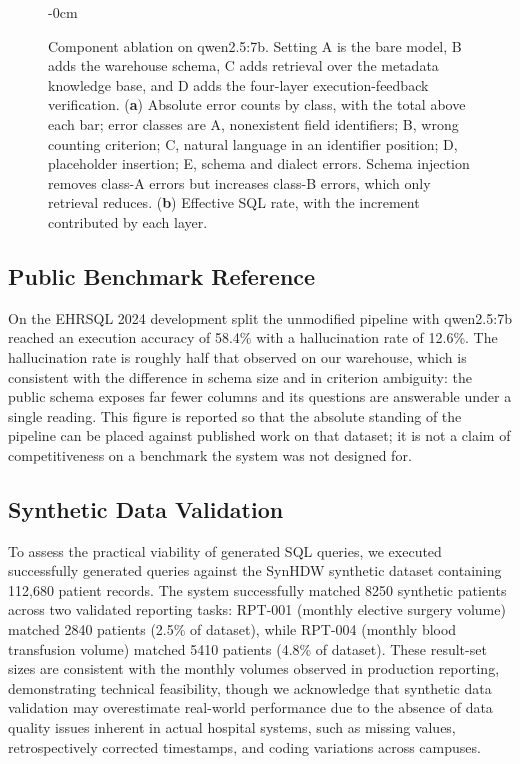 \documentclass[applsci,article,submit,pdftex,oneauthor]{Definitions/mdpi}
\begin{document}
\begin{figure}[H]
\begin{adjustwidth}{-\extralength}{0cm}
\caption{Component ablation on qwen2.5:7b. Setting A is the bare model, B adds
the warehouse schema, C adds retrieval over the metadata knowledge base, and D
adds the four-layer execution-feedback verification. (\textbf{a}) Absolute error
counts by class, with the total above each bar; error classes are A, nonexistent
field identifiers; B, wrong counting criterion; C, natural language in an
identifier position; D, placeholder insertion; E, schema and dialect errors.
Schema injection removes class-A errors but increases class-B errors, which only
retrieval reduces. (\textbf{b}) Effective SQL rate, with the increment
contributed by each layer.}
\label{fig:ablation}
\end{adjustwidth}
\end{figure}

\subsection{Public Benchmark Reference}\label{sec:bench}
On the EHRSQL 2024 development split the unmodified pipeline with qwen2.5:7b
reached an execution accuracy of 58.4\% with a hallucination rate of 12.6\%. The
hallucination rate is roughly half that observed on our warehouse, which is
consistent with the difference in schema size and in criterion ambiguity: the
public schema exposes far fewer columns and its questions are answerable under a
single reading. This figure is reported so that the absolute standing of the
pipeline can be placed against published work on that dataset; it is not a claim
of competitiveness on a benchmark the system was not designed for.

\subsection{Synthetic Data Validation}
To assess the practical viability of generated SQL queries, we executed
successfully generated queries against the SynHDW synthetic dataset containing
112,680 patient records. The system successfully matched 8250 synthetic patients
across two validated reporting tasks: RPT-001 (monthly elective surgery volume)
matched 2840 patients (2.5\% of dataset), while RPT-004 (monthly blood transfusion volume) matched 5410 patients (4.8\% of dataset). These result-set
sizes are consistent with the monthly volumes observed in production reporting,
demonstrating technical feasibility, though we acknowledge that synthetic data
validation may overestimate real-world performance due to the absence of data
quality issues inherent in actual hospital systems, such as missing values,
retrospectively corrected timestamps, and coding variations across campuses.
\end{document}
